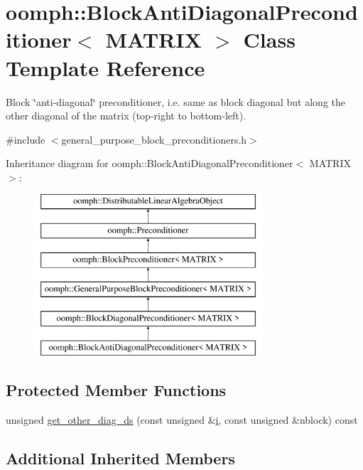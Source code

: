 \hypertarget{classoomph_1_1BlockAntiDiagonalPreconditioner}{}\section{oomph\+:\+:Block\+Anti\+Diagonal\+Preconditioner$<$ M\+A\+T\+R\+IX $>$ Class Template Reference}
\label{classoomph_1_1BlockAntiDiagonalPreconditioner}


Block \char`\"{}anti-\/diagonal\char`\"{} preconditioner, i.\+e. same as block diagonal but along the other diagonal of the matrix (top-\/right to bottom-\/left).  




{\ttfamily \#include $<$general\+\_\+purpose\+\_\+block\+\_\+preconditioners.\+h$>$}

Inheritance diagram for oomph\+:\+:Block\+Anti\+Diagonal\+Preconditioner$<$ M\+A\+T\+R\+IX $>$\+:\begin{figure}[H]
\begin{center}
\leavevmode
\includegraphics[height=6.000000cm]{classoomph_1_1BlockAntiDiagonalPreconditioner}
\end{center}
\end{figure}
\subsection*{Protected Member Functions}
\begin{DoxyCompactItemize}
\item 
unsigned \hyperlink{classoomph_1_1BlockAntiDiagonalPreconditioner_a880a182c7aca041992146d559c109fdb}{get\+\_\+other\+\_\+diag\+\_\+ds} (const unsigned \&\hyperlink{cfortran_8h_adb50e893b86b3e55e751a42eab3cba82}{i}, const unsigned \&nblock) const
\end{DoxyCompactItemize}
\subsection*{Additional Inherited Members}


